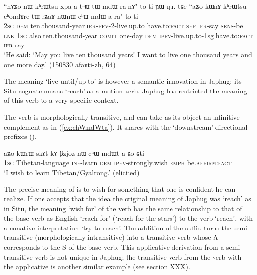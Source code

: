  \begin{exe}
\ex \label{ex:chWmdWa}
\gll ``nɤʑo nɯ kʰrɯtsu-xpa a-tʰɯ-tɯ-mdɯ ra nɤ" to-ti ɲɯ-ŋu. tɕe ``aʑo kɯnɤ kʰrɯtsu cʰondɤre tɯ-rʑaʁ nɯnɯ cʰɯ-mdɯ-a ra" to-ti \\
\textsc{2sg} \textsc{dem} ten.thousand-year \textsc{irr}-\textsc{pfv}-2-live.up.to have.to:\textsc{fact} \textsc{sfp} \textsc{ifr}-say \textsc{sens}-be \textsc{lnk} \textsc{1sg} also  ten.thousand-year \textsc{comit} one-day \textsc{dem} \textsc{ipfv}-live.up.to-1sg have.to:\textsc{fact} \textsc{ifr}-say \\
\glt `He said: `May you live ten thousand years! I want to live one thousand years and one more day.' (150830 afanti-zh, 64)
\end{exe}

The meaning `live until/up to' is however a semantic innovation in Japhug: its Situ cognate  means `reach' as a motion verb. Japhug has restricted the meaning of this verb to a very specific context.

The verb  is morphologically transitive, and can take as its object an infinitive complement as in (\ref{ex:chWmdWta}). It shares with  the `downstream' directional prefixes ().

 \begin{exe}
\ex \label{ex:chWmdWta}
\gll aʑo kɯrɯ-skɤt kɤ-βzjoz nɯ cʰɯ-mdɯt-a ʑo ɕti \\
\textsc{1sg} Tibetan-language \textsc{inf}-learn \textsc{dem} \textsc{ipfv}-strongly.wish \textsc{emph} be.\textsc{affirm}:\textsc{fact} \\
\glt `I wish to learn Tibetan/Gyalrong.' (elicited)
\end{exe}

The precise meaning of   is to wish for something that one is confident he can realize. If one accepts that the idea the original meaning of Japhug  was `reach' as in Situ, the meaning `wish for' of the verb  has the same relationship to that of the base verb as English `reach for' (`reach for the stars') to the verb `reach', with a conative interpretation `try to reach'.  The addition of the suffix  turns the semi-transitive (morphologically intransitive)  into a transitive verb whose A corresponds to the S of the base verb. This applicative derivation from a semi-transitive verb is not unique in Japhug; the transitive verb  from the verb  with the  applicative is another similar example (see section XXX).


